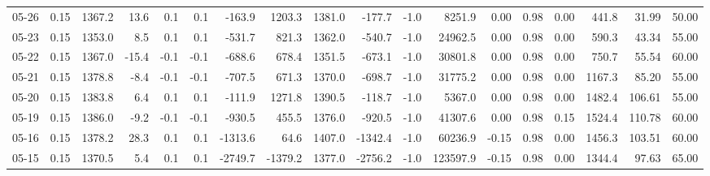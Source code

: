 \begin{threeparttable}
{\begin{tabular}{lrrrrrrrrrrrrrrrrr}
  05-26 &     0.15 & 1367.2 &              13.6 &               0.1 &                0.1 &             -163.9 &  1203.3 & 1381.0 &     -177.7 &                     -1.0 &              8251.9 &       0.00 &      0.98 &           0.00 &            441.8 &           31.99 &                  50.00 \\
  05-23 &     0.15 & 1353.0 &               8.5 &               0.1 &                0.1 &             -531.7 &   821.3 & 1362.0 &     -540.7 &                     -1.0 &             24962.5 &       0.00 &      0.98 &           0.00 &            590.3 &           43.34 &                  55.00 \\
  05-22 &     0.15 & 1367.0 &             -15.4 &              -0.1 &               -0.1 &             -688.6 &   678.4 & 1351.5 &     -673.1 &                     -1.0 &             30801.8 &       0.00 &      0.98 &           0.00 &            750.7 &           55.54 &                  60.00 \\
  05-21 &     0.15 & 1378.8 &              -8.4 &              -0.1 &               -0.1 &             -707.5 &   671.3 & 1370.0 &     -698.7 &                     -1.0 &             31775.2 &       0.00 &      0.98 &           0.00 &           1167.3 &           85.20 &                  55.00 \\
  05-20 &     0.15 & 1383.8 &               6.4 &               0.1 &                0.1 &             -111.9 &  1271.8 & 1390.5 &     -118.7 &                     -1.0 &              5367.0 &       0.00 &      0.98 &           0.00 &           1482.4 &          106.61 &                  55.00 \\
  05-19 &     0.15 & 1386.0 &              -9.2 &              -0.1 &               -0.1 &             -930.5 &   455.5 & 1376.0 &     -920.5 &                     -1.0 &             41307.6 &       0.00 &      0.98 &           0.15 &           1524.4 &          110.78 &                  60.00 \\
  05-16 &     0.15 & 1378.2 &              28.3 &               0.1 &                0.1 &            -1313.6 &    64.6 & 1407.0 &    -1342.4 &                     -1.0 &             60236.9 &      -0.15 &      0.98 &           0.00 &           1456.3 &          103.51 &                  60.00 \\
  05-15 &     0.15 & 1370.5 &               5.4 &               0.1 &                0.1 &            -2749.7 & -1379.2 & 1377.0 &    -2756.2 &                     -1.0 &            123597.9 &      -0.15 &      0.98 &           0.00 &           1344.4 &           97.63 &                  65.00 \\

\end{tabular}}
\end{threeparttable}
